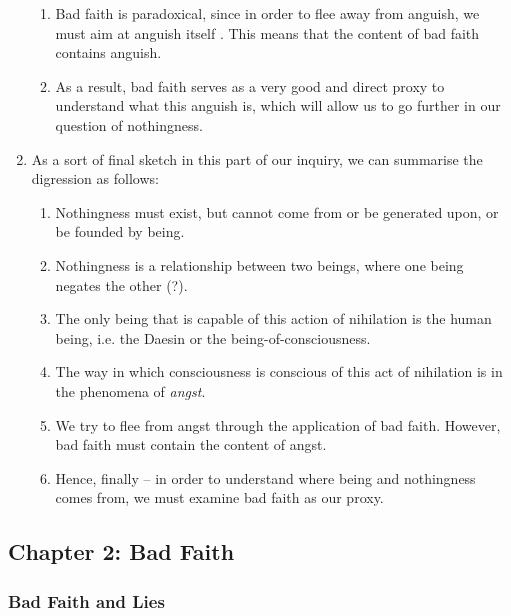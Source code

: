 \begin{enumerate}
\begin{enumerate}
    \item Bad faith is paradoxical, since in order to flee away from anguish, we must aim at anguish itself \autocite[86]{sartre}. This means that the content of bad faith contains anguish.
    \item As a result, bad faith serves as a very good and direct proxy to understand what this anguish is, which will allow us to go further in our question of nothingness.
  \end{enumerate}
  \item As a sort of final sketch in this part of our inquiry, we can summarise the digression as follows:
  \begin{enumerate}
    \item Nothingness must exist, but cannot come from or be generated upon, or be founded by being.
    \item Nothingness is a relationship between two beings, where one being negates the other (?).
    \item The only being that is capable of this action of nihilation is the human being, i.e. the Daesin or the being-of-consciousness.
    \item The way in which consciousness is conscious of this act of nihilation is in the phenomena of \emph{angst}.
    \item We try to flee from angst through the application of bad faith. However, bad faith must contain the content of angst.
    \item Hence, finally -- in order to understand where being and nothingness comes from, we must examine bad faith as our proxy.
  \end{enumerate}
\end{enumerate}

\subsection{Chapter 2: Bad Faith}

\subsubsection{Bad Faith and Lies}

